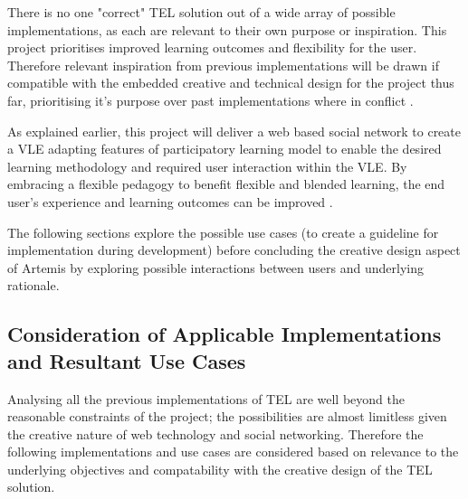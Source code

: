 There is no one "correct" TEL solution out of a wide array of possible implementations, as each are relevant to their own purpose or inspiration. This project  prioritises improved learning outcomes and flexibility for the user. Therefore relevant inspiration from previous implementations will be drawn if compatible with the embedded creative and technical design for the project thus far, prioritising it's purpose over past implementations where in conflict \cite{Burge2011}.

As explained earlier, this project will deliver a web based social network to create a VLE \cite{Gordon2014,Burge2011} adapting features of  participatory learning model \cite{Yager1990,Yager2004} to enable the desired learning methodology and required user interaction within the VLE. By embracing a flexible pedagogy to benefit flexible  and blended learning, the end user's experience and learning outcomes can be improved \cite{Gordon2014,Burge2011}.

The following sections explore the possible use cases (to create a guideline for implementation during development) before concluding the creative design aspect of Artemis by exploring possible interactions between users and underlying rationale.


\subsection{Consideration of Applicable Implementations and Resultant Use Cases}
\label{subsec:subsec01}


Analysing all the previous implementations of TEL are well beyond the reasonable constraints of the project; the possibilities are almost limitless given the creative nature of web technology and social networking. Therefore the following implementations and use cases are considered based on relevance to the underlying objectives and compatability with the creative design of the TEL solution.


